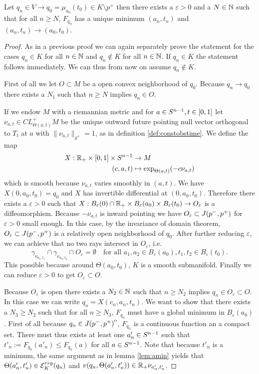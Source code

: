 \begin{proposition}\label{prop:boundarymin}
    Let $q_n\in V\to q_0=\mu_{a_0}(t_0)\in K\setminus p^+$ then there exists a $\varepsilon>0$ and a $N\in \mathbb{N}$ such that for all $n\ge N$, $F_{q_n}$ has a unique minimum $(a_n,t_n)$ and $(a_n,t_n)\to (a_0,t_0)$.
\end{proposition}
\begin{proof}
    As in a previous proof we can again separately prove the statement for the cases $q_n\in K$ for all $n\in \mathbb{N}$ and $q_n \notin K$ for all $n\in \mathbb{N}$. If $q_n \in K$ the statement follows immediately. We can thus from now on assume $q_n \notin K$.

    First of all we let $O\subset M$ be a open convex neighborhood of $q_0$. Because $q_n \to q_0$ there exists a $N_1$ such that $n\ge N$ implies $q_n \in O$.

    If we endow $M$ with a riemannian metric and for $a\in {S^{n-1}}, t\in [0,1]$ let $\nu_{a,t}\in CL^+_{\Theta(a,t)}M$ be the unique outward future pointing null vector orthogonal to $T_t$ at $a$ with $\lVert \nu_{a,t} \rVert_{g^+}=1$, as in definition \ref{def:constobstime}. We define the map 
    \begin{align*}
        X:\mathbb{R}_+\times [0,1] \times {S^{n-1}} &\to M \\
        (c,a,t)&\mapsto \exp_{\Theta(a,t)}(-c\nu_{a,t})
    \end{align*} which is smooth because $\nu_{a,t}$ varies smoothly in $(a,t)$. We have $X(0,a_0,t_0)=q_0$ and $X$ has invertible differential at $(0,a_0,t_0)$. Therefore there exists a $\varepsilon>0$ such that $X:B_\varepsilon(0)\cap \mathbb{R}_+ \times B_\varepsilon(a_0) \times B_\varepsilon(t_0) \to O_\varepsilon$ is a diffeomorphism. Because $-\nu_{a,t}$ is inward pointing we have $O_\varepsilon\subset J(p^-,p^+)$ for $\varepsilon>0$ small enough. In this case, by the invariance of domain theorem, $O_\varepsilon\subset J(p^-,p^+)$ is a relatively open neighborhood of $q_0$. After further reducing $\varepsilon$, we can achieve that no two rays intersect in $O_\varepsilon$, i.e. 
    \[
        \gamma_{\nu_{a_1,t_1}} \cap \gamma_{\nu_{a_2,t_2}} \cap O_\varepsilon=\emptyset \quad  \text{for all } a_1,a_2\in B_\varepsilon(a_0), t_1,t_2 \in B_\varepsilon(t_0).
    \] This possible because around $\Theta(a_0,t_0)$, $K$ is a smooth submanifold.
    Finally we can reduce $\varepsilon>0$ to get $O_\varepsilon\subset O$.
    
    Because $O_\varepsilon$ is open there exists a $N_2\in \mathbb{N}$ such that $n\ge N_2$ implies $q_n\in O_\varepsilon\subset O$.
    In this case we can write $q_n = X(c_n,a_n,t_n)$. We want to show that there exists a $N_3\ge N_2$ such that for all $n\ge N_3$, $F_{q_n}$ must have a global minimum in $B_\varepsilon(a_0)$. First of all because $q_n \in {\kern0ptJ(p^-,p^+)}^{\mathrm{o}}$, $F_{q_n}$ is a continuous function an a compact set. There must thus exists at least one $a'_n\in {S^{n-1}}$ such that $t'_n := F_{q_n}(a'_n) \leq F_{q_n}(a)$ for all $a\in {S^{n-1}}$. Note that because $t'_n$ is a minimum, the same argument as in lemma \ref{lem:amin} yields that $\Theta(a'_n,t_n')\in {{\mathcal{E}}^{reg}_K}(q_n)$ and $v(q_n,\Theta(a'_n,t_n')) \in \mathbb{R}_+\nu_{a_n',t_n'}$.
    

\end{proof}
